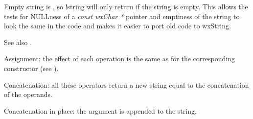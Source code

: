 
Empty string is \false, so !string will only return \true if the string is empty.
This allows the tests for NULLness of a {\it const wxChar *} pointer and emptiness
of the string to look the same in the code and makes it easier to port old code
to wxString.

See also .


\label{wxstringoperatorassign}




Assignment: the effect of each operation is the same as for the corresponding
constructor (see ).


\label{wxstringoperatorplus}

Concatenation: all these operators return a new string equal to the
concatenation of the operands.






\label{wxstringplusequal}




Concatenation in place: the argument is appended to the string.


\label{wxstringoperatorbracket}



